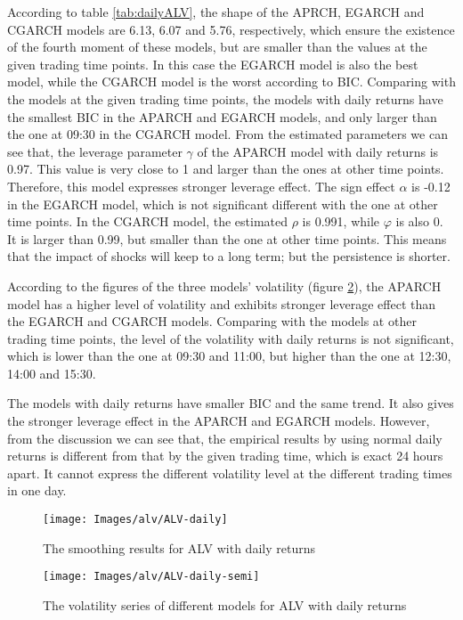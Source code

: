 According to table \ref{tab:dailyALV}, the shape of the APRCH, EGARCH and CGARCH models are 6.13, 6.07 and 5.76, respectively, which ensure the existence of the fourth moment of these models, but are smaller than the values at the given trading time points. In this case the EGARCH model is also the best model, while the CGARCH model is the worst according to BIC. Comparing with the models at the given trading time points, the models with daily returns have the smallest BIC in the APARCH and EGARCH models, and only larger than the one at 09:30 in the CGARCH model. From the estimated parameters we can see that, the leverage parameter $\gamma$ of the APARCH model with daily returns is 0.97. This value is very close to 1 and larger than the ones at other time points. Therefore, this model expresses stronger leverage effect. The sign effect $\alpha$ is -0.12 in the EGARCH model, which is not significant different with the one at other time points. In the CGARCH model, the estimated $\rho$ is 0.991, while $\varphi$ is also 0. It is larger than 0.99, but smaller than the one at other time points. This means that the impact of shocks will keep to a long term; but the persistence is shorter.

According to the figures of the three models' volatility (figure \ref{fig:ALVdailysemi}), the APARCH model has a higher level of volatility and exhibits stronger leverage effect than the EGARCH and CGARCH models. Comparing with the models at other trading time points, the level of the volatility with daily returns is not significant, which is lower than the one at 09:30 and 11:00, but higher than the one at 12:30, 14:00 and 15:30.

The models with daily returns have smaller BIC and the same trend. It also gives the stronger leverage effect in the APARCH and EGARCH models. However, from the discussion we can see that, the empirical results by using normal daily returns is different from that by the given trading time, which is exact 24 hours apart. It cannot express the different volatility level at the different trading times in one day.

\begin{figure}[!htbp]
	\centering
	\texttt{[image: Images/alv/ALV-daily]}
	\caption[The smoothing results for ALV with daily returns]{The smoothing results for ALV with daily returns}
	\label{fig:ALVdaily}
\end{figure}


\begin{figure}[!htbp]
	\centering
	\texttt{[image: Images/alv/ALV-daily-semi]}
	\caption[The volatility series of different models for ALV with daily returns]{The volatility series of different models for ALV with daily returns}
	\label{fig:ALVdailysemi}
\end{figure}




